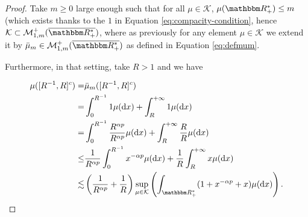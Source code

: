 \documentclass[a4paper,11pt, reqno]{amsart}
\newcommand{\cK}{\mathcal{K}}	\newcommand{\KK}{\mathbbm{K}}
\newcommand{\cM}{\mathcal{M}}	\newcommand{\MM}{\mathbbm{M}}
\newcommand{\dd}{\mathop{}\!\mathrm{d}}
\newcommand{\1}{\mathbbm{1}}
\theoremstyle{plain}
\theoremstyle{definition}
\begin{document}
\begin{proof}
  Take $m \ge 0$ large enough such that for all $\mu \in \cK$,
  $\mu (\RR_+^{\ast}) \le m$ (which exists thanks to the $1$ in
  Equation \eqref{eq:compacity-condition}, hence $\cK \subset
  \cM_{1, m}^+ (\overline{\RR_+^{\ast}})$, where as previously
  for any element $\mu \in \cK$ we extend it by $\bar{\mu}_m \in
  \cM_{1, m}^+ (\overline{\RR_+^{\ast}})$ as defined in
  Equation \eqref{eq:defmum}.
  
  Furthermore, in that setting, take $R > 1$ and we have
  
  \begin{align*}
    \mu ([R^{- 1}, R]^c) = & \bar{\mu}_m ([R^{- 1}, R]^c)\\
    = & \int_0^{R^{- 1}} 1 \mu (\dd x) + \int_R^{+ \infty} 1 \mu (\dd
    x)\\
    = & \int_0^{R^{- 1}} \frac{R^{\alpha p}}{R^{\alpha p}} \mu (\dd x) +
    \int_R^{+ \infty} \frac{R}{R} \mu (\dd x)\\
    \le & \frac{1}{R^{\alpha p}} \int_0^{R^{- 1}} x^{- \alpha p} \mu
    (\dd x) + \frac{1}{R} \int_R^{+ \infty} x \mu (\dd x)\\
    \lesssim & \left( \frac{1}{R^{\alpha p}} + \frac{1}{R} \right)
    \underset{\mu \in \cK}{\sup} \left( \int_{\RR_+^*} (1 + x^{- \alpha p} +
    x) \mu (\dd x) \right) .
  \end{align*}
  

\end{proof}
\end{document}
